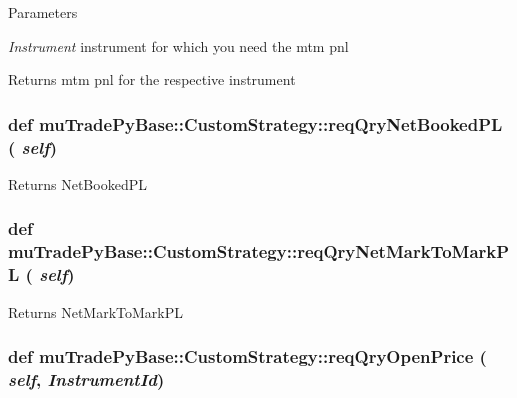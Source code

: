 \begin{DoxyParams}{Parameters}
\item[{\em Instrument}]instrument for which you need the mtm pnl \end{DoxyParams}
\begin{DoxyReturn}{Returns}
mtm pnl for the respective instrument 
\end{DoxyReturn}
\hypertarget{classmuTradePyBase_1_1CustomStrategy_ab2bb976f03464a96a1eaad71384988c8}{
\subsubsection[{reqQryNetBookedPL}]{\setlength{\rightskip}{0pt plus 5cm}def muTradePyBase::CustomStrategy::reqQryNetBookedPL ( {\em self})}}
\label{classmuTradePyBase_1_1CustomStrategy_ab2bb976f03464a96a1eaad71384988c8}
\begin{DoxyReturn}{Returns}
NetBookedPL 
\end{DoxyReturn}
\hypertarget{classmuTradePyBase_1_1CustomStrategy_af22277e5d655d83298baff704eb15c20}{
\subsubsection[{reqQryNetMarkToMarkPL}]{\setlength{\rightskip}{0pt plus 5cm}def muTradePyBase::CustomStrategy::reqQryNetMarkToMarkPL ( {\em self})}}
\label{classmuTradePyBase_1_1CustomStrategy_af22277e5d655d83298baff704eb15c20}
\begin{DoxyReturn}{Returns}
NetMarkToMarkPL 
\end{DoxyReturn}
\hypertarget{classmuTradePyBase_1_1CustomStrategy_a72c9d6257adaa1e0a568e09f0df0ef15}{
\subsubsection[{reqQryOpenPrice}]{\setlength{\rightskip}{0pt plus 5cm}def muTradePyBase::CustomStrategy::reqQryOpenPrice ( {\em self}, \/   {\em InstrumentId})}}
\label{classmuTradePyBase_1_1CustomStrategy_a72c9d6257adaa1e0a568e09f0df0ef15}

